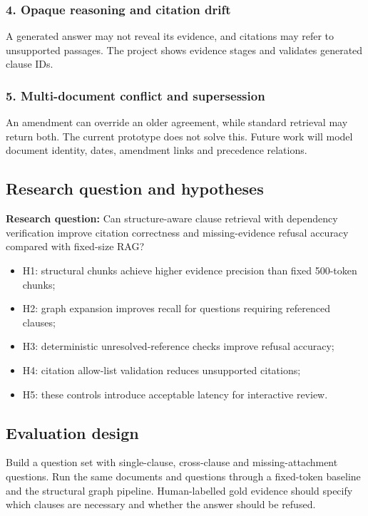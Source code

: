 \documentclass[11pt,letterpaper]{article}
\begin{document}
\subsubsection{4. Opaque reasoning and citation drift}
A generated answer may not reveal its evidence, and citations may refer to unsupported passages. The project shows evidence stages and validates generated clause IDs.

\subsubsection{5. Multi-document conflict and supersession}
An amendment can override an older agreement, while standard retrieval may return both. The current prototype does not solve this. Future work will model document identity, dates, amendment links and precedence relations.

\subsection{Research question and hypotheses}
\textbf{Research question:} Can structure-aware clause retrieval with dependency verification improve citation correctness and missing-evidence refusal accuracy compared with fixed-size RAG?
\begin{itemize}
  \item H1: structural chunks achieve higher evidence precision than fixed 500-token chunks;
  \item H2: graph expansion improves recall for questions requiring referenced clauses;
  \item H3: deterministic unresolved-reference checks improve refusal accuracy;
  \item H4: citation allow-list validation reduces unsupported citations;
  \item H5: these controls introduce acceptable latency for interactive review.
\end{itemize}

\subsection{Evaluation design}
Build a question set with single-clause, cross-clause and missing-attachment questions. Run the same documents and questions through a fixed-token baseline and the structural graph pipeline. Human-labelled gold evidence should specify which clauses are necessary and whether the answer should be refused.
\end{document}
